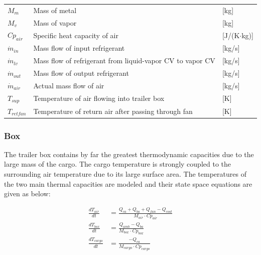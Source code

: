 \begin{center}
\begin{tabular}{l p{10cm} l}
		$M_{m}$          & Mass of metal                                                            & [\si{kg}]                         \\
		$M_{v}$          & Mass of vapor                                                            & [\si{kg}]                         \\
		$Cp_{air}$       & Specific heat capacity of air                                            & [\si{J}/(\si{K}$ \cdot $\si{kg})] \\
		$\dot{m}_{in} $  & Mass flow of input refrigerant                                           & [\si{kg}/\si{s}]                  \\
		$\dot{m}_{lv} $  & Mass flow of refrigerant from liquid-vapor CV to vapor CV                & [\si{kg}/\si{s}]                  \\
		$\dot{m}_{out} $ & Mass flow of output refrigerant                                          & [\si{kg}/\si{s}]                  \\
		$\dot{m}_{air}$  & Actual mass flow of air                                                  & [\si{kg}/\si{s}]                  \\
		$T_{sup} $       & Temperature of air flowing into trailer box                              & [\si{K}]                          \\
		$T_{retfan}$     & Temperature of return air after passing through fan                      & [\si{K}]
	\end{tabular}
\end{center}


\subsubsection{Box}
The trailer box contains by far the greatest thermodynamic capacities due to the large mass of the cargo. The cargo temperature is strongly coupled to the surrounding air temperature due to its large surface area. The temperatures of the two main thermal capacities are modeled and their state space equations are given as below:

\begin{align}
	\frac{dT_{air}}{dt} & = \frac{Q_{ca} + Q_{ba} + Q_{fan} -Q_{cool}}{M_{air} \cdot Cp_{air}} \\
	\frac{dT_{box}}{dt} & = \frac{Q_{amb} - Q_{ba}}{M_{box} \cdot Cp_{box}} \\
	\frac{dT_{cargo}}{dt} & = \frac{-Q_{ca}}{M_{cargo} \cdot Cp_{cargo}}
\end{align}

